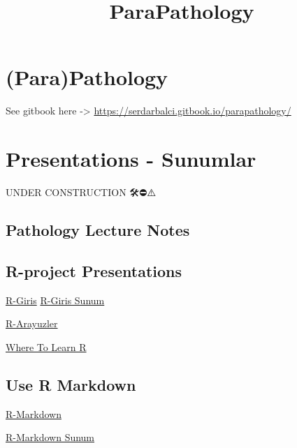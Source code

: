\documentclass[]{article}
\title{ParaPathology}
\author{}
\date{}
\begin{document}
\maketitle

{
\setcounter{tocdepth}{2}
\tableofcontents
}
\hypertarget{parapathology}{%
\section{(Para)Pathology}\label{parapathology}}

See gitbook here -\textgreater{}
\url{https://serdarbalci.gitbook.io/parapathology/}

\hypertarget{presentations---sunumlar}{%
\section{Presentations - Sunumlar}\label{presentations---sunumlar}}

UNDER CONSTRUCTION 🛠⛔️⚠️🔩

\hypertarget{pathology-lecture-notes}{%
\subsection{Pathology Lecture Notes}\label{pathology-lecture-notes}}

\hypertarget{r-project-presentations}{%
\subsection{R-project Presentations}\label{r-project-presentations}}

\href{https://sbalci.github.io/MyRCodesForDataAnalysis/R-Giris.nb.html}{R-Giris}
\href{https://sbalci.github.io/MyRCodesForDataAnalysis/R-Giris.html}{R-Giris
Sunum}

\href{https://sbalci.github.io/MyRCodesForDataAnalysis/R-Arayuzler.nb.html}{R-Arayuzler}

\href{https://sbalci.github.io/MyRCodesForDataAnalysis/WhereToLearnR.nb.html}{Where
To Learn R}

\hypertarget{use-r-markdown}{%
\subsection{Use R Markdown}\label{use-r-markdown}}

\href{https://sbalci.github.io/MyRCodesForDataAnalysis/R-Markdown.nb.html}{R-Markdown}

\href{https://sbalci.github.io/MyRCodesForDataAnalysis/R-Markdown.html}{R-Markdown
Sunum}
\end{document}
